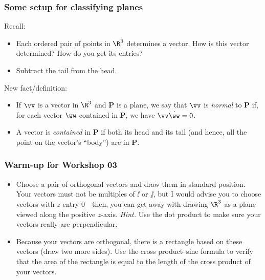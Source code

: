 \documentclass[11pt,ignorenonframetext,xcolor={svgnames},aspectratio=169]{beamer}
\begin{document}
\begin{frame}\frametitle{Some setup for classifying planes}

Recall:

\begin{itemize}

\item
  Each ordered pair of points in $\R^3$ determines a vector. How is this
  vector determined? How do you get its entries?
  \pause
\item
  Subtract the tail from the head.
\end{itemize}

New fact/definition:

\begin{itemize}
\item
  If $\vv$ is a vector in $\R^3$ and $\mathbf{P}$ is a plane, we say
  that $\vv$ is \emph{normal} to $\mathbf{P}$ if, for each vector $\ww$
  contained in $\mathbf{P}$, we have $\vv \dot \ww  = 0$.
\item
  A vector is \emph{contained} in $\mathbf{P}$ if both its head and its
  tail (and hence, all the point on the vector's ``body'') are in
  $\mathbf{P}$.
\end{itemize}

\end{frame}

\begin{frame}\frametitle{Warm-up for Workshop 03}

\begin{itemize}
\item
  Choose a pair of orthogonal vectors and draw them in standard
  position. Your vectors must not be multiples of $\ii$ or $\jj$, but I
  would advise you to choose vectors with $z$-entry $0$---then, you can
  get away with drawing $\R^{3}$ as a plane viewed along the positive
  $z$-axis. \emph{Hint.} Use the dot product to make sure your vectors
  really are perpendicular.
\item
  Because your vectors are orthogonal, there is a rectangle based on
  these vectors (draw two more sides). Use the cross product--sine
  formula to verify that the area of the rectangle is equal to the
  length of the cross product of your vectors.
\end{itemize}

\end{frame}
\end{document}
